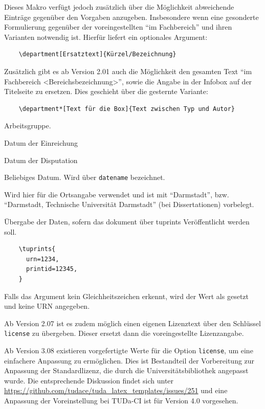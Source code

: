 \begin{description}
	Dieses Makro verfügt jedoch zusätzlich über die Möglichkeit abweichende Einträge gegenüber den Vorgaben anzugeben. Insbesondere wenn eine gesonderte Formulierung gegenüber der voreingestellten \enquote{im Fachbereich} und ihren Varianten notwendig ist. Hierfür liefert  ein optionales Argument:

	\begin{verbatim}
	\department[Ersatztext]{Kürzel/Bezeichnung}
	\end{verbatim}
	Zusätzlich gibt es ab Version 2.01 auch die Möglichkeit den gesamten Text \enquote{im Fachbereich <Bereichsbezeichnung>}, sowie die Angabe in der Infobox auf der Titelseite zu ersetzen. Dies geschieht über die gesternte Variante:
	\begin{verbatim}
	\department*[Text für die Box]{Text zwischen Typ und Autor}
	\end{verbatim}
	\item[group] Arbeitsgruppe.
	\item[submissiondate] Datum der Einreichung
	\item[examdate] Datum der Disputation
	\item[date] Beliebiges Datum. Wird über \verb|datename| bezeichnet.
	\item[publishers] Wird hier für die Ortsangabe verwendet und ist mit \enquote{Darmstadt}, bzw. \enquote{Darmstadt, Technische Universität Darmstadt} (bei Dissertationen) vorbelegt.
	\item[tuprints] \label{page:tuprints}Übergabe der Daten, sofern das dokument über tuprints Veröffentlicht werden soll.
	\begin{verbatim}
	\tuprints{
	  urn=1234,
	  printid=12345,
	}
	\end{verbatim}
	Falls das Argument kein Gleichheitszeichen erkennt, wird der Wert als  gesetzt und keine URN angegeben.

	Ab Version 2.07 ist es zudem möglich einen eigenen Lizenztext über den Schlüssel \verb|license| zu übergeben. Dieser ersetzt dann die voreingestellte Lizenzangabe.

	Ab Version 3.08 existieren vorgefertigte Werte für die Option \verb|license|, um eine einfachere Anpassung zu ermöglichen.
	Dies ist Bestandteil der Vorbereitung zur Anpassung der Standardlizenz, die durch die Universitätsbibliothek angepasst wurde.
	Die entsprechende Diskussion findet sich unter \url{https://github.com/tudace/tuda_latex_templates/issues/251} und eine Anpassung der Voreinstellung bei TUDa-CI ist für Version 4.0 vorgesehen.


\end{description}
